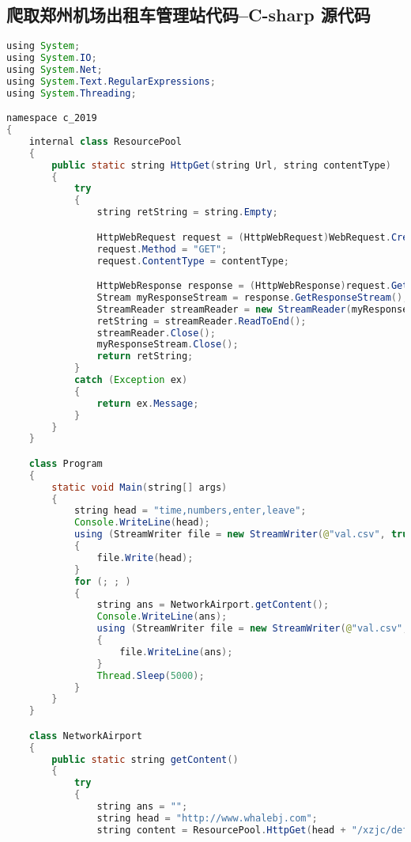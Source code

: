 \documentclass{cumcmthesis}
\begin{document}
\newpage
\begin{appendices}

	\section{爬取郑州机场出租车管理站代码--C-sharp 源代码}
	\begin{lstlisting}[language=java]
using System;
using System.IO;
using System.Net;
using System.Text.RegularExpressions;
using System.Threading;

namespace c_2019
{
    internal class ResourcePool
    {
        public static string HttpGet(string Url, string contentType)
        {
            try
            {
                string retString = string.Empty;

                HttpWebRequest request = (HttpWebRequest)WebRequest.Create(Url);
                request.Method = "GET";
                request.ContentType = contentType;

                HttpWebResponse response = (HttpWebResponse)request.GetResponse();
                Stream myResponseStream = response.GetResponseStream();
                StreamReader streamReader = new StreamReader(myResponseStream);
                retString = streamReader.ReadToEnd();
                streamReader.Close();
                myResponseStream.Close();
                return retString;
            }
            catch (Exception ex)
            {
                return ex.Message;
            }
        }
    }

    class Program
    {
        static void Main(string[] args)
        {
            string head = "time,numbers,enter,leave";
            Console.WriteLine(head);
            using (StreamWriter file = new StreamWriter(@"val.csv", true))
            {
                file.Write(head);
            }
            for (; ; )
            {
                string ans = NetworkAirport.getContent();
                Console.WriteLine(ans);
                using (StreamWriter file = new StreamWriter(@"val.csv", true))
                {
                    file.WriteLine(ans);
                }
                Thread.Sleep(5000);
            }
        }
    }

    class NetworkAirport
    {
        public static string getContent()
        {
            try
            {
                string ans = "";
                string head = "http://www.whalebj.com";
                string content = ResourcePool.HttpGet(head + "/xzjc/default.aspx", "");


\end{lstlisting}
\end{appendices}
\end{document}
